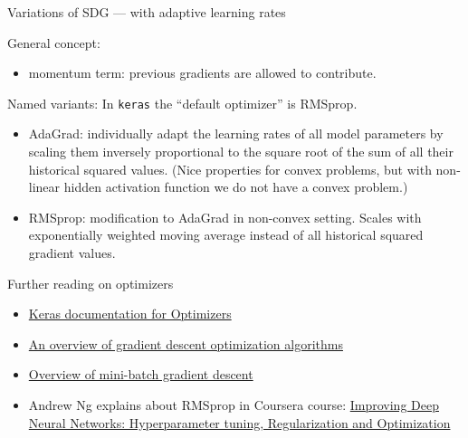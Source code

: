 \documentclass[10pt,ignorenonframetext,]{beamer}
\providecommand{\tightlist}{%
  \setlength{\itemsep}{0pt}\setlength{\parskip}{0pt}}
\begin{document}
\begin{frame}[fragile]

\begin{block}{Variations of SDG --- with adaptive learning rates}

General concept:

\begin{itemize}
\tightlist
\item
  momentum term: previous gradients are allowed to contribute.
\end{itemize}

Named variants: In \texttt{keras} the ``default optimizer'' is RMSprop.

\begin{itemize}
\tightlist
\item
  AdaGrad: individually adapt the learning rates of all model parameters
  by scaling them inversely proportional to the square root of the sum
  of all their historical squared values. (Nice properties for convex
  problems, but with non-linear hidden activation function we do not
  have a convex problem.)
\item
  RMSprop: modification to AdaGrad in non-convex setting. Scales with
  exponentially weighted moving average instead of all historical
  squared gradient values.
\end{itemize}

\end{block}

\end{frame}

\begin{frame}

\begin{block}{Further reading on optimizers}

\begin{itemize}
\tightlist
\item
  \href{https://keras.io/optimizers/}{Keras documentation for
  Optimizers}
\item
  \href{http://ruder.io/optimizing-gradient-descent/index.html}{An
  overview of gradient descent optimization algorithms}
\item
  \href{http://www.cs.toronto.edu/~tijmen/csc321/slides/lecture_slides_lec6.pdf}{Overview
  of mini-batch gradient descent}
\item
  Andrew Ng explains about RMSprop in Coursera course:
  \href{https://www.coursera.org/learn/deep-neural-network/lecture/BhJlm/rmsprop}{Improving
  Deep Neural Networks: Hyperparameter tuning, Regularization and
  Optimization}
\end{itemize}

\end{block}

\end{frame}
\end{document}
